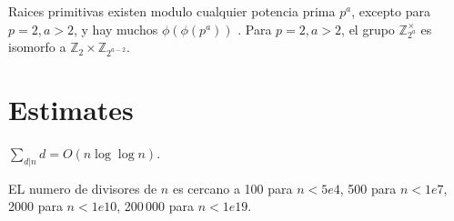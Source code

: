 	Raices primitivas existen modulo cualquier potencia prima $p^a$, excepto para $p = 2, a > 2$, y hay muchos $\phi(\phi(p^a))$ .
	Para $p = 2, a > 2$, el grupo $\mathbb Z_{2^a}^\times$ es isomorfo a $\mathbb Z_2 \times \mathbb Z_{2^{a-2}}$.

\section{Estimates}
	$\sum_{d|n} d = O(n \log \log n)$.

	EL numero de divisores de $n$ es cercano a 100 para $n < 5e4$, 500 para $n < 1e7$, 2000 para $n < 1e10$, 200\,000 para $n < 1e19$.

%
%
%
